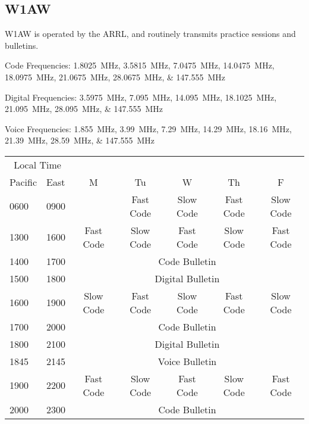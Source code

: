 \documentclass[11pt, onecolumn, table]{article}
\begin{document}
\subsection{W1AW}
W1AW is operated by the ARRL, and routinely transmits practice sessions and bulletins.

Code Frequencies: \SIlist{1.8025;3.5815;7.0475;14.0475;18.0975;21.0675;28.0675;147.555}{\MHz}

Digital Frequencies: \SIlist{3.5975;7.095;14.095;18.1025;21.095;28.095;147.555}{\MHz}

Voice Frequencies: \SIlist{1.855;3.99;7.29;14.29;18.16;21.39;28.59;147.555}{\MHz}

\begin{table}[tbh]
  \begin{tabular}{l l c c c c c}
    \multicolumn{2}{c}{Local Time}	&			&			&			&			&			\\
    Pacific	&	East				& M			& Tu		& W			& Th		& F			\\
    \midrule
    0600	&	0900				&			& Fast Code	& Slow Code	& Fast Code	& Slow Code	\\
    1300	&	1600				& Fast Code	& Slow Code	& Fast Code	& Slow Code	& Fast Code	\\
    1400	&	1700				& \multicolumn{5}{c}{\cellcolor{gray!10}Code Bulletin}		\\
    1500	&	1800				& \multicolumn{5}{c}{\cellcolor{gray!10}Digital Bulletin}	\\
    1600	&	1900				& Slow Code	& Fast Code	& Slow Code	& Fast Code	& Slow Code	\\
    1700	&	2000				& \multicolumn{5}{c}{\cellcolor{gray!10}Code Bulletin}		\\
    1800	&	2100				& \multicolumn{5}{c}{\cellcolor{gray!10}Digital Bulletin}	\\
    1845	&	2145				& \multicolumn{5}{c}{\cellcolor{gray!10}Voice Bulletin}		\\
    1900	&	2200				& Fast Code	& Slow Code	& Fast Code	& Slow Code	& Fast Code	\\
    2000	&	2300				& \multicolumn{5}{c}{\cellcolor{gray!10}Code Bulletin}		\\
  \end{tabular}
\end{table}
\end{document}
